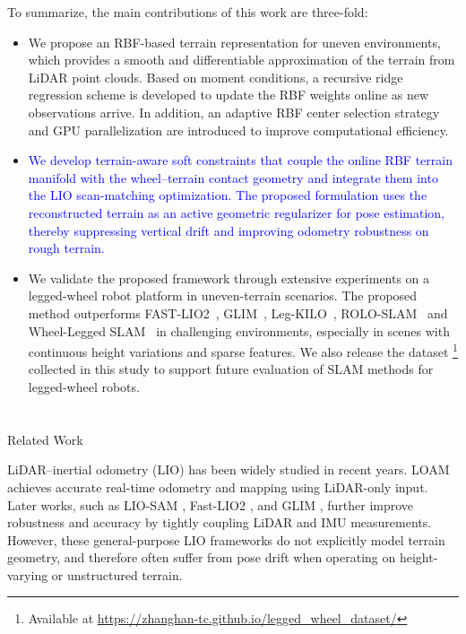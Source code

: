 \documentclass[journal,twoside,web]{ieeecolor}
\makeatletter
\newcommand{\cs}[1]{\textcolor{blue}{#1}}
\let\origsection\section
\def\section{\@ifstar\sectionstarcolor\sectioncolor}
\def\sectioncolor#1{\origsection{\textcolor{nblue}{#1}}}
\def\sectionstarcolor#1{\origsection*{#1}}
\makeatother
\begin{document}
To summarize, the main contributions of this work are three-fold:
\begin{itemize}
    \item We propose an RBF-based terrain representation for uneven environments, which provides a smooth and differentiable approximation of the terrain from LiDAR point clouds. Based on moment conditions, a recursive ridge regression scheme is developed to update the RBF weights online as new observations arrive. In addition, an adaptive RBF center selection strategy and GPU parallelization are introduced to improve computational efficiency.
    
    \item \cs{We develop terrain-aware soft constraints that couple the online RBF terrain manifold with the wheel--terrain contact geometry and integrate them into the LIO scan-matching optimization. The proposed formulation uses the reconstructed terrain as an active geometric regularizer for pose estimation, thereby suppressing vertical drift and improving odometry robustness on rough terrain.}
    
    \item We validate the proposed framework through extensive experiments on a legged-wheel robot platform in uneven-terrain scenarios. The proposed method outperforms FAST-LIO2~\cite{fastlio2}, GLIM~\cite{glim}, Leg-KILO~\cite{leg-kilo}, ROLO-SLAM~\cite{roloslam} and Wheel-Legged SLAM~\cite{wl-slam} in challenging environments, especially in scenes with continuous height variations and sparse features. We also release the dataset \footnote{Available at \url{https://zhanghan-tc.github.io/legged_wheel_dataset/}} collected in this study to support future evaluation of SLAM methods for legged-wheel robots.
\end{itemize}

\section{Related Work}

LiDAR--inertial odometry (LIO) has been widely studied in recent years. LOAM \cite{loam} achieves accurate real-time odometry and mapping using LiDAR-only input. Later works, such as LIO-SAM \cite{liosam}, Fast-LIO2 \cite{fastlio2, fastlio}, and GLIM \cite{glim}, further improve robustness and accuracy by tightly coupling LiDAR and IMU measurements. However, these general-purpose LIO frameworks do not explicitly model terrain geometry, and therefore often suffer from pose drift when operating on height-varying or unstructured terrain.
\end{document}
